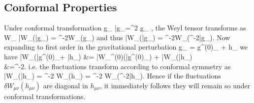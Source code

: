 \documentclass[10pt,letterpaper]{article}
\begin{document}
\subsection{Conformal Properties}
Under conformal transformation
\be
	g_{\mu\nu} \to \bar g_{\mu\nu}=\Omega^2 g_{\mu\nu} ,
\ee
the Weyl  tensor  transforms as
\be
	W_{\mu\nu} \to \bar W_{\mu\nu}(\bar g_{\mu\nu})  = \Omega^{-2}W_{\mu\nu}(g_{\mu\nu})
\ee
and thus
\be
	\bar W_{\mu\nu}(\bar g_{\mu\nu}) =  \Omega^{-2}W_{\mu\nu}(\Omega^{-2}\bar g_{\mu\nu}).
\ee
Now expanding to first order in the gravitational
perturbation
\be
	g_{\mu\nu} = g^{(0)}_{\mu\nu} + h_{\mu\nu}
\ee
we have 
\ba
	\bar W_{\mu\nu}(\bar g^{(0)}_{\mu\nu}+ \bar h_{\mu\nu}) &= \bar W_{\mu\nu}^{(0)}(\bar g^{(0)}_{\mu\nu}) + \delta \bar W_{\mu\nu}(\bar h_{\mu\nu})\\
	&=\Omega^{-2}.
\ea
i.e. the  fluctuations transform according to conformal symmetry as 
\be
	\delta \bar W_{\mu\nu}(\bar h_{\mu\nu}) = \Omega^{-2} \delta W_{\mu\nu}(h_{\mu\nu}) = \Omega^{-2} \delta W_{\mu\nu}(\Omega^{-2}\bar h_{\mu\nu}).
\ee
Hence if the fluctuations  $\delta W_{\mu\nu}(h_{\mu\nu})$ are diagonal in $h_{\mu\nu}$, it immediately follows they will remain so under conformal transformations. 
\end{document}
